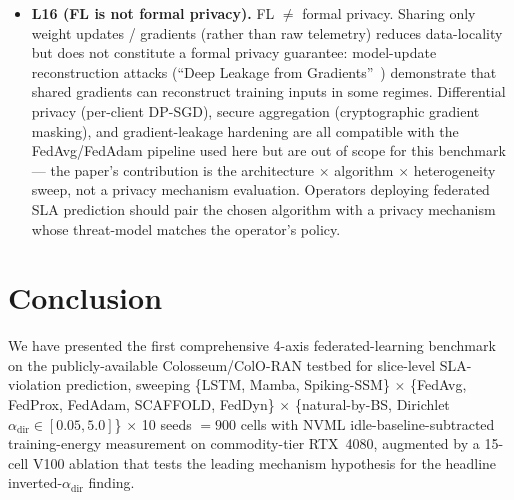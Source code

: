 \documentclass[journal]{IEEEtran}
\newcommand{\alphadir}{\ensuremath{\alpha_{\mathrm{dir}}}}
\begin{document}
\begin{itemize}
  \item \textbf{L16 (FL is not formal privacy).} FL $\neq$ formal privacy. Sharing only weight updates / gradients (rather than raw telemetry) reduces data-locality but does not constitute a formal privacy guarantee: model-update reconstruction attacks (``Deep Leakage from Gradients''~\cite{Zhu2019_DLG}) demonstrate that shared gradients can reconstruct training inputs in some regimes. Differential privacy (per-client DP-SGD), secure aggregation (cryptographic gradient masking), and gradient-leakage hardening are all compatible with the FedAvg/FedAdam pipeline used here but are out of scope for this benchmark --- the paper's contribution is the architecture $\times$ algorithm $\times$ heterogeneity sweep, not a privacy mechanism evaluation. Operators deploying federated SLA prediction should pair the chosen algorithm with a privacy mechanism whose threat-model matches the operator's policy.
\end{itemize}


\section{Conclusion}\label{sec:conclusion}

We have presented the first comprehensive 4-axis federated-learning benchmark on the publicly-available Colosseum/ColO-RAN testbed for slice-level SLA-violation prediction, sweeping \{LSTM, Mamba, Spiking-SSM\} $\times$ \{FedAvg, FedProx, FedAdam, SCAFFOLD, FedDyn\} $\times$ \{natural-by-BS, Dirichlet $\alphadir \in [0.05, 5.0]$\} $\times$ 10 seeds $= 900$ cells with NVML idle-baseline-subtracted training-energy measurement on commodity-tier RTX~4080, augmented by a 15-cell V100 ablation that tests the leading mechanism hypothesis for the headline inverted-$\alphadir$ finding.
\end{document}
